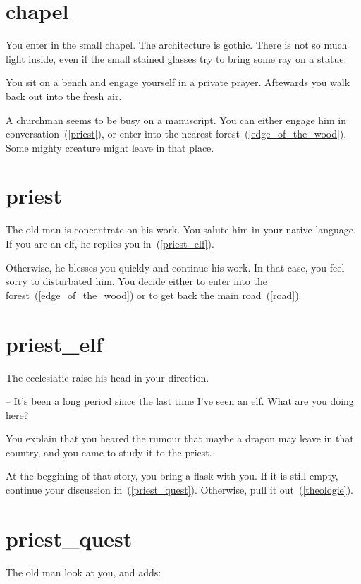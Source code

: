 \section{chapel}

You enter in the small chapel. The architecture is gothic. There is not so much
light inside, even if the small stained glasses try to bring some ray on a
statue.

You sit on a bench and engage yourself in a private prayer. Aftewards you walk
back out into the fresh air.

A churchman seems to be busy on a manuscript. You can either engage him in
conversation~(\ref{priest}), or enter into the nearest
forest~(\ref{edge_of_the_wood}). Some mighty creature might leave in that place.

\section{priest}

The old man is concentrate on his work. You salute him in your native language.
If you are an elf, he replies you in~(\ref{priest_elf}).

Otherwise, he blesses you quickly and continue his work. In that case, you feel
sorry to disturbated him. You decide either to enter into the
forest~(\ref{edge_of_the_wood}) or to get back the main road~(\ref{road}).

\section{priest_elf}

The ecclesiatic raise his head in your direction.

-- It's been a long period since the last time I've seen an elf. What are you
doing here?

You explain that you heared the rumour that maybe a dragon may leave in that
country, and you came to study it to the priest.

At the beggining of that story, you bring a flask with you. If it is still
empty, continue your discussion in~(\ref{priest_quest}). Otherwise, pull it
out~(\ref{theologie}).

\section{priest_quest}

The old man look at you, and adds:

